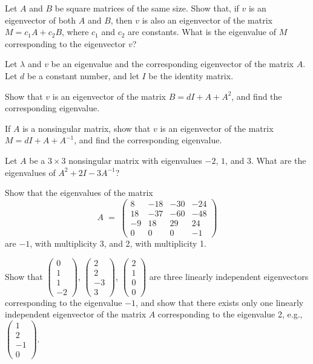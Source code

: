 \begin{exercises}

\item Let $A$ and $B$ be square matrices of the same size. Show that, if $v$ is
an eigenvector of both $A$ and $B$, then $v$ is also an eigenvector of the
matrix $M = c_1 A + c_2 B$, where $c_1$ and $c_2$ are constants. What is the
eigenvalue of $M$ corresponding to the eigenvector $v$?

\item Let $\lambda$ and $v$ be an eigenvalue and the corresponding
eigenvector of the matrix $A$. Let $d$ be a constant number, and let $I$ be
the identity matrix.
\begin{subparts}
\item Show that $v$ is an eigenvector of the matrix $B = dI + A + A^2$, and
find the corresponding eigenvalue.
\item If $A$ is a nonsingular matrix, show that $v$ is an eigenvector of the
matrix $M = dI + A + A^{-1}$, and find the corresponding eigenvalue.
\end{subparts}

\item Let $A$ be a $3 \times 3$ nonsingular matrix with eigenvalues $-2$, $1$,
and $3$. What are the eigenvalues of $A^2 + 2I - 3A^{-1}$?

\item
\begin{subparts}
\item Show that the eigenvalues of the matrix
\[
A \;=\; \begin{pmatrix} 8 & -18 & -30 & -24\\ 18 & -37 & -60 & -48\\ -9 & 18 & 29 & 24\\ 0 & 0 & 0 & -1 \end{pmatrix}
\]
are $-1$, with multiplicity 3, and 2, with multiplicity 1.

Show that $\begin{pmatrix} 0\\ 1\\ 1\\ -2 \end{pmatrix}$,
$\begin{pmatrix} 2\\ 2\\ -3\\ 3 \end{pmatrix}$,
$\begin{pmatrix} 2\\ 1\\ 0\\ 0 \end{pmatrix}$ are three linearly independent
eigenvectors corresponding to the eigenvalue $-1$, and show that there exists
only one linearly independent eigenvector of the matrix $A$ corresponding to
the eigenvalue 2, e.g., $\begin{pmatrix} 1\\ 2\\ -1\\ 0 \end{pmatrix}$.


\end{subparts}
\end{exercises}

